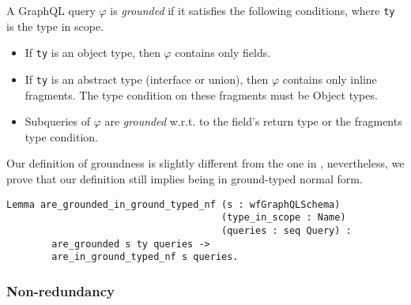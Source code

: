 \begin{definition}
A GraphQL query $\varphi$ is \textit{grounded} if it satisfies the following conditions, where \texttt{ty} is the type in scope.
\begin{itemize}
	\item If \texttt{ty} is an object type, then $\varphi$ contains only fields.
	\item If \texttt{ty} is an abstract type (interface or union), then $\varphi$ contains only inline fragments. The type condition on these fragments must be Object types.
	\item Subqueries of $\varphi$ are \textit{grounded} w.r.t. to the field's return type or the fragments type condition.
\end{itemize}
\end{definition}

Our definition of groundness is slightly different from the one in \HP{}, nevertheless, we prove that our definition still implies being in ground-typed normal form.

\begin{verbatim}
Lemma are_grounded_in_ground_typed_nf (s : wfGraphQLSchema)
                                      (type_in_scope : Name)
                                      (queries : seq Query) :
        are_grounded s ty queries ->
        are_in_ground_typed_nf s queries.
\end{verbatim}

\subsubsection*{Non-redundancy}

